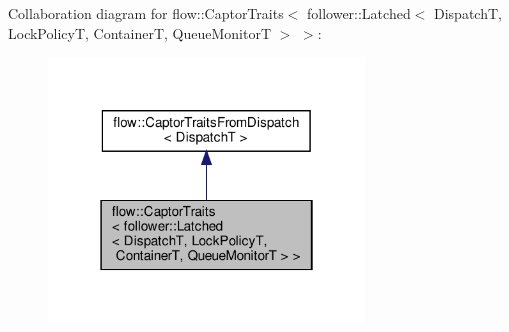 Collaboration diagram for flow\+:\+:Captor\+Traits$<$ follower\+:\+:Latched$<$ DispatchT, Lock\+PolicyT, ContainerT, Queue\+MonitorT $>$ $>$\+:
\nopagebreak
\begin{figure}[H]
\begin{center}
\leavevmode
\includegraphics[width=238pt]{structflow_1_1_captor_traits_3_01follower_1_1_latched_3_01_dispatch_t_00_01_lock_policy_t_00_01_0a454d79367eed3f91b8ffa394457121}
\end{center}
\end{figure}
